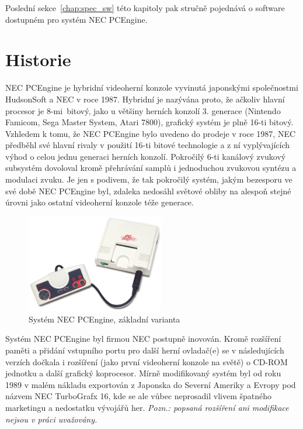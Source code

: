Poslední sekce~\ref{chap:spec_sw} této kapitoly pak stručně pojednává o
software dostupném pro systém NEC PCEngine.


\section{Historie}\label{chap:spec_history}

NEC PCEngine je hybridní videoherní konzole vyvinutá japonskými společnostmi
HudsonSoft a NEC v roce 1987. Hybridní je nazývána proto, že ačkoliv hlavní
procesor je 8-mi~bitový, jako u většiny herních konzolí 3. generace
(Nintendo Famicom, Sega Master System, Atari 7800), grafický systém je plně
16-ti bitový. Vzhledem k tomu, že NEC PCEngine bylo uvedeno do prodeje v roce
1987, NEC předběhl své hlavní rivaly v použití 16-ti bitové technologie a z ní
vyplývajících výhod o celou jednu generaci herních konzolí. Pokročilý 6-ti
kanálový zvukový subsystém dovoloval kromě přehrávání samplů i jednoduchou
zvukovou syntézu a modulaci zvuku. Je jen s podivem, že tak pokročilý systém,
jakým bezesporu ve své době NEC PCEngine byl, zdaleka nedosáhl světové obliby
na alespoň stejné úrovni jako ostatní videoherní konzole téže
generace.~\cite{wwwClassicGaming, wwwWikiTurboGrafx}

\begin{figure}[ht]
\begin{center}
\includegraphics[width=6cm]{fig/pce_photo}
\caption{Systém NEC PCEngine, základní varianta\label{fig:pce_photo}}
\end{center}
\end{figure}

Systém NEC PCEngine byl firmou NEC postupně inovován. Kromě rozšíření paměti a
přidání vstupního portu pro další herní ovladač(e) se v následujících verzích
dočkala i rozšíření (jako první videoherní konzole na světě) o CD-ROM jednotku
a další grafický koprocesor. Mírně modifikovaný systém byl od roku 1989 v malém
nákladu exportován z Japonska do Severní Ameriky a Evropy pod názvem NEC
TurboGrafx 16, kde se ale vůbec neprosadil vlivem špatného marketingu a
nedostatku vývojářů her. {\em Pozn.: popsaná rozšíření ani modifikace nejsou v
práci uvažovány.}~\cite{wwwClassicGaming, BartonLoguidice09}

